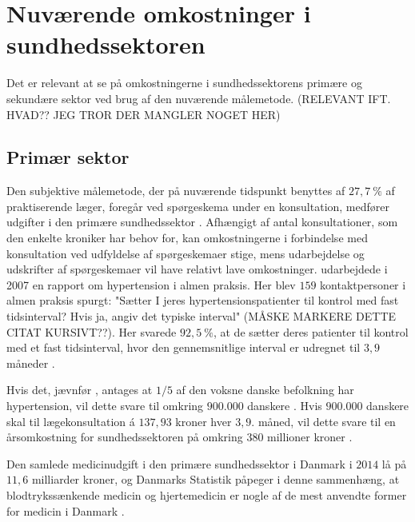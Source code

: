 \section{Nuværende omkostninger i sundhedssektoren}
Det er relevant at se på omkostningerne i sundhedssektorens primære og sekundære sektor ved brug af den nuværende målemetode. (RELEVANT IFT. HVAD?? JEG TROR DER MANGLER NOGET HER)

\subsection{Primær sektor} \label{sec:nuv_primaer}
\label{sec:primaer_sektor_omkostninger}
Den subjektive målemetode, der på nuværende tidspunkt benyttes af $27,7~\%$ af praktiserende læger, foregår ved spørgeskema under en konsultation, medfører udgifter i den primære sundhedssektor \citep{munck2007}. Afhængigt af antal konsultationer, som den enkelte kroniker har behov for, kan omkostningerne i forbindelse med konsultation ved udfyldelse af spørgeskemaer stige, mens udarbejdelse og udskrifter af spørgeskemaer vil have relativt lave omkostninger.
\citeauthor{munck2007} udarbejdede i 2007 en rapport om hypertension i almen praksis. Her blev $159$ kontaktpersoner i almen praksis spurgt: "Sætter I jeres hypertensionspatienter til kontrol med fast tidsinterval? Hvis ja, angiv det typiske interval" (MÅSKE MARKERE DETTE CITAT KURSIVT??). Her svarede $92,5~\%$, at de sætter deres patienter til kontrol med et fast tidsinterval, hvor den gennemsnitlige interval er udregnet til $3,9$ måneder \citep{munck2007}. 

Hvis det, jævnfør \citeauthor{kronborg2008}, antages at $1/5$ af den voksne danske befolkning har hypertension, vil dette svare til omkring $900.000$ danskere \citep{folketal2016}. Hvis $900.000$ danskere skal til lægekonsultation á $137,93$ kroner hver $3,9$. måned, vil dette svare til en årsomkostning for sundhedssektoren på omkring $380$ millioner kroner \citep{honorartabel2016}. 

Den samlede medicinudgift i den primære sundhedssektor i Danmark i $2014$ lå på $11,6$ milliarder kroner, og Danmarks Statistik påpeger i denne sammenhæng, at blodtrykssænkende medicin og hjertemedicin er nogle af de mest anvendte former for medicin i Danmark \citep{dst2016}. 

